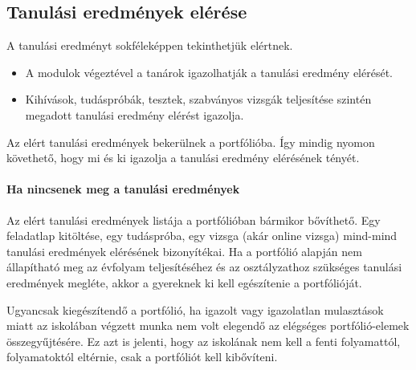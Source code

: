 \hypertarget{tanulasi-eredmenyek-elerese}{%
\subsection{Tanulási eredmények
elérése}\label{tanulasi-eredmenyek-elerese}}

A tanulási eredményt sokféleképpen tekinthetjük elértnek.

\begin{itemize}
\tightlist
\item
  A modulok végeztével a tanárok igazolhatják a tanulási eredmény
  elérését.
\item
  Kihívások, tudáspróbák, tesztek, szabványos vizsgák teljesítése
  szintén megadott tanulási eredmény elérést igazolja.
\end{itemize}

Az elért tanulási eredmények bekerülnek a portfólióba. Így mindig nyomon
követhető, hogy mi és ki igazolja a tanulási eredmény elérésének tényét.

\hypertarget{ha-nincsenek-meg-a-tanulasi-eredmenyek}{%
\paragraph{Ha nincsenek meg a tanulási
eredmények}\label{ha-nincsenek-meg-a-tanulasi-eredmenyek}}

Az elért tanulási eredmények listája a portfólióban bármikor bővíthető.
Egy feladatlap kitöltése, egy tudáspróba, egy vizsga (akár online
vizsga) mind-mind tanulási eredmények elérésének bizonyítékai. Ha a
portfólió alapján nem állapítható meg az évfolyam teljesítéséhez és az
osztályzathoz szükséges tanulási eredmények megléte, akkor a gyereknek
ki kell egészítenie a portfólióját.

Ugyancsak kiegészítendő a portfólió, ha igazolt vagy igazolatlan
mulasztások miatt az iskolában végzett munka nem volt elegendő az
elégséges portfólió-elemek összegyűjtésére. Ez azt is jelenti, hogy az
iskolának nem kell a fenti folyamattól, folyamatoktól eltérnie, csak a
portfóliót kell kibővíteni.
